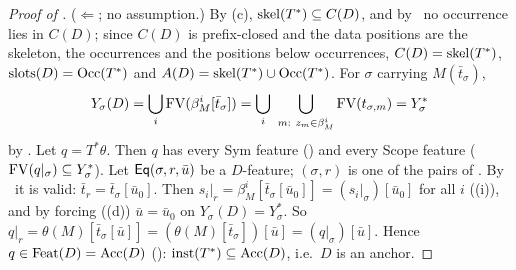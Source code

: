 \begin{proof}[Proof of ]
($\Leftarrow$; no assumption.) By (c), $\mathrm{skel}(T^*)\subseteq C(D)$, and by \evRs\ no occurrence lies in $C(D)$; since $C(D)$ is prefix-closed and the data positions are the skeleton, the occurrences and the positions below occurrences, $C(D)=\mathrm{skel}(T^*)$, $\mathrm{slots}(D)=\mathrm{Occ}(T^*)$ and $A(D)=\mathrm{skel}(T^*)\cup\mathrm{Occ}(T^*)$. For $\sigma$ carrying $M(\bar t_\sigma)$,
\[
Y_\sigma(D)=\bigcup_i\FV(\beta^i_M[\bar t_\sigma])=\bigcup_i\ \bigcup_{m:\ z_m\in\beta^i_M}\FV(t_{\sigma,m})=Y^*_\sigma
\]
by \evN. Let $q=T^*\theta$. Then $q$ has every Sym feature () and every Scope feature ($\mathrm{FV}(q|_\sigma)\subseteq Y^*_\sigma$). Let $\mathsf{Eq}(\sigma,r,\bar u)$ be a $D$-feature; $(\sigma,r)$ is one of the pairs of . By \evU\ it is valid: $\bar t_r=\bar t_\sigma[\bar u_0]$. Then $s_i|_r=\beta^i_M[\bar t_\sigma[\bar u_0]]=(s_i|_\sigma)[\bar u_0]$ for all $i$ ((i)), and by forcing ((d)) $\bar u=\bar u_0$ on $Y_\sigma(D)=Y^*_\sigma$. So $q|_r=\theta(M)[\bar t_\sigma[\bar u]]=(\theta(M)[\bar t_\sigma])[\bar u]=(q|_\sigma)[\bar u]$. Hence $q\in\mathrm{Feat}(D)=\mathrm{Acc}(D)$ (): $\mathrm{inst}(T^*)\subseteq\mathrm{Acc}(D)$, i.e.\ $D$ is an anchor.


\end{proof}
